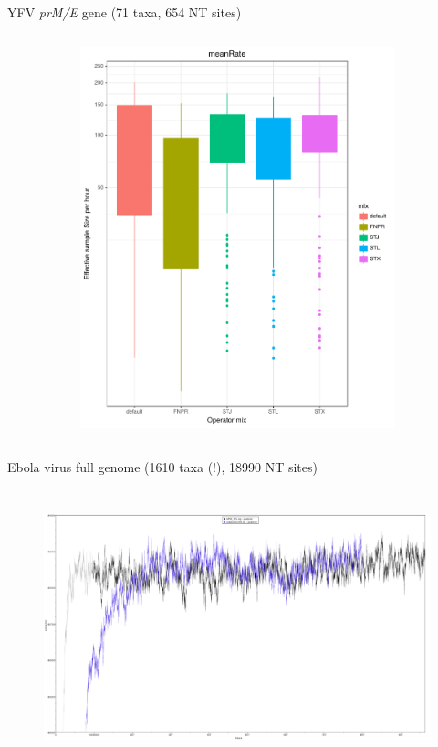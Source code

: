 \documentclass[newPxFont,numfooter,sectionpages]{beamer}
\begin{document}
\begin{frame}{YFV \textit{prM/E} gene (71 taxa, 654 NT sites)}
\begin{figure}
\begin{column}{0.5\textwidth}
\begin{figure}
     \includegraphics[width=\textwidth]{figures/ESS_hour_meanRate_YFV.pdf} \\
     \end{figure}
\end{column}
\end{figure}
\end{frame}

\begin{frame}{Ebola virus full genome (1610 taxa (!), 18990 NT sites)}
\begin{figure}
	\includegraphics[width=\textwidth,height=8cm]{figures/comparison_ebola.pdf} 
\end{figure}
\end{frame}
\end{document}
